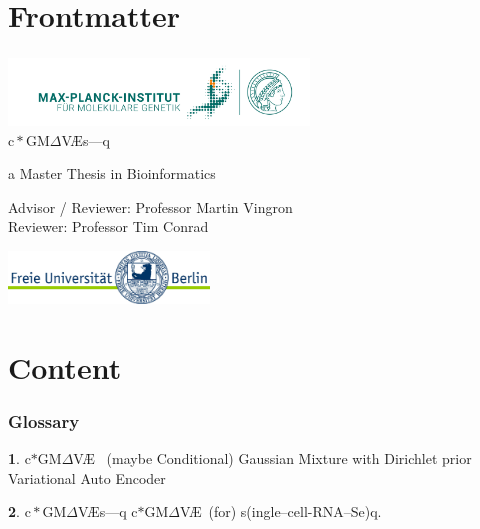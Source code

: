 \documentclass[final]{beamer}
\title{\scgmvae}{}
\author{Kolb, Yiftach}
\theoremstyle{plain}
\theoremstyle{definition}
\newtheorem{mydef}{}[section]
\theoremstyle{remark}
\newcommand{\gmvae}{c$\ast$GM$\Delta$V\AE~}
\newcommand{\scgmvae}{$\mathrm{c}{\ast}\mathrm{GM}\Delta$V{\AE}s---q}
\begin{document}
\maketitle

\section{Frontmatter}

\begin{frame}
\frametitle{}
\begin{center}
{\includegraphics[width=0.60\textwidth]{images/MPIMG_RGB_gruen.png}}\\
\vspace*{1cm}
\large
\scgmvae

\normalsize
a Master Thesis in Bioinformatics
\vspace{0.2cm}

Advisor / Reviewer: Professor Martin Vingron\\
Reviewer: Professor Tim Conrad

\vfill



\vfill
{\includegraphics[width=0.4\textwidth]{images/fu-logo_bildschirm_RGB1.jpg}}
\end{center}
\normalsize
\end{frame}

\section{Content}

\begin{frame}
\frametitle{Glossary}
\begin{mydef}{\gmvae}
(maybe Conditional) Gaussian Mixture with Dirichlet
prior Variational Auto Encoder
\end{mydef}

\begin{mydef}{\scgmvae}
\gmvae (for) s(ingle--cell-RNA--Se)q.
\end{mydef}
\end{frame}
\end{document}
